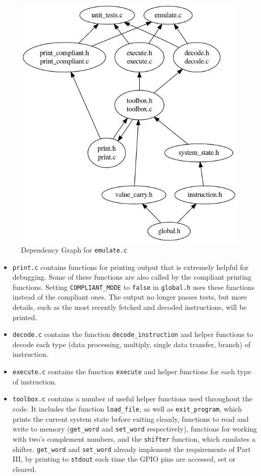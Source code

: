 \documentclass[10pt]{article}
\begin{document}
\begin{figure}[H]
\begin{minipage}{0.35\linewidth}
\centering
\includegraphics[scale=0.3]{Checkpoint/emulate.png}
\caption{Dependency Graph for \texttt{emulate.c}}

\end{minipage}
\end{figure}

\begin{itemize}
\item \texttt{print.c} contains functions for printing output that is extremely helpful for debugging. Some of these functions are also called by the compliant printing functions. Setting \texttt{COMPLIANT\_MODE} to \texttt{false} in \texttt{global.h} uses these functions instead of the compliant ones. The output no longer passes tests, but more details, such as the most recently fetched and decoded instructions, will be printed.
\item \texttt{decode.c} contains the function \texttt{decode\_instruction} and helper functions to decode each type (data processing, multiply, single data transfer, branch) of instruction.
\item \texttt{execute.c} contains the function \texttt{execute} and helper functions for each type of instruction.
\item \texttt{toolbox.c} contains a number of useful helper functions used throughout the code. It includes the function \texttt{load\_file}, as well as \texttt{exit\_program}, which prints the current system state before exiting cleanly, functions to read and write to memory (\texttt{get\_word} and \texttt{set\_word} respectively), functions for working with two's complement numbers, and the \texttt{shifter} function, which emulates a shifter. \texttt{get\_word} and \texttt{set\_word} already implement the requirements of Part III, by printing to \texttt{stdout} each time the GPIO pins are accessed, set or cleared.
\end{itemize}
\end{document}
